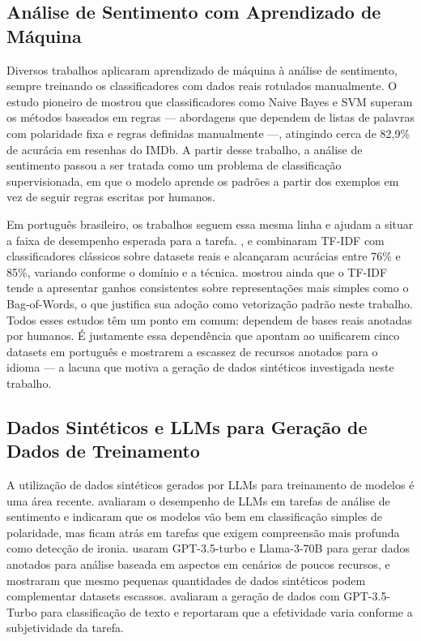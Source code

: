 \documentclass[12pt]{article}
\begin{document}
\subsection{Análise de Sentimento com Aprendizado de Máquina}

Diversos trabalhos aplicaram aprendizado de máquina à análise de sentimento, sempre treinando os classificadores com dados reais rotulados manualmente. O estudo pioneiro de \cite{pang2002} mostrou que classificadores como Naive Bayes e SVM superam os métodos baseados em regras — abordagens que dependem de listas de palavras com polaridade fixa e regras definidas manualmente —, atingindo cerca de 82,9\% de acurácia em resenhas do IMDb. A partir desse trabalho, a análise de sentimento passou a ser tratada como um problema de classificação supervisionada, em que o modelo aprende os padrões a partir dos exemplos em vez de seguir regras escritas por humanos.

Em português brasileiro, os trabalhos seguem essa mesma linha e ajudam a situar a faixa de desempenho esperada para a tarefa. \cite{kansaon2019}, \cite{souza2021} e \cite{rossi2019} combinaram TF-IDF com classificadores clássicos sobre datasets reais e alcançaram acurácias entre 76\% e 85\%, variando conforme o domínio e a técnica. \cite{rossi2019} mostrou ainda que o TF-IDF tende a apresentar ganhos consistentes sobre representações mais simples como o Bag-of-Words, o que justifica sua adoção como vetorização padrão neste trabalho. Todos esses estudos têm um ponto em comum: dependem de bases reais anotadas por humanos. É justamente essa dependência que \cite{souza2022brazilian} apontam ao unificarem cinco datasets em português e mostrarem a escassez de recursos anotados para o idioma — a lacuna que motiva a geração de dados sintéticos investigada neste trabalho.

\subsection{Dados Sintéticos e LLMs para Geração de Dados de Treinamento}

A utilização de dados sintéticos gerados por LLMs para treinamento de modelos é uma área recente. \cite{zhang2024sentiment} avaliaram o desempenho de LLMs em tarefas de análise de sentimento e indicaram que os modelos vão bem em classificação simples de polaridade, mas ficam atrás em tarefas que exigem compreensão mais profunda como detecção de ironia. \cite{hellwig2025exploring} usaram GPT-3.5-turbo e Llama-3-70B para gerar dados anotados para análise baseada em aspectos em cenários de poucos recursos, e mostraram que mesmo pequenas quantidades de dados sintéticos podem complementar datasets escassos. \cite{li2023synthetic} avaliaram a geração de dados com GPT-3.5-Turbo para classificação de texto e reportaram que a efetividade varia conforme a subjetividade da tarefa.
\end{document}

